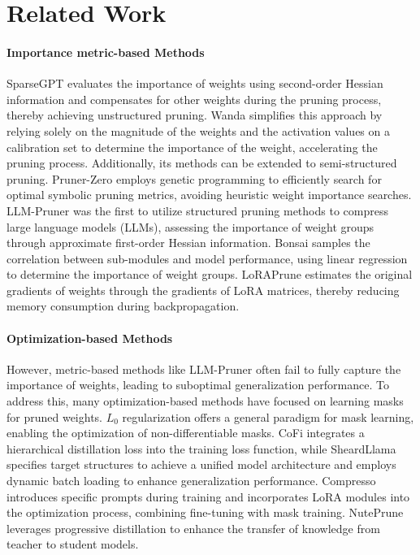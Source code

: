 \section{Related Work}

\paragraph{Importance metric-based Methods}SparseGPT \cite{frantar2023sparsegpt} evaluates the importance of weights using second-order Hessian information and compensates for other weights during the pruning process, thereby achieving unstructured pruning. Wanda \cite{sun2023wanda} simplifies this approach by relying solely on the magnitude of the weights and the activation values on a calibration set to determine the importance of the weight, accelerating the pruning process. Additionally, its methods can be extended to semi-structured pruning. Pruner-Zero \cite{dong2024pruner} employs genetic programming to efficiently search for optimal symbolic pruning metrics, avoiding heuristic weight importance searches. LLM-Pruner \cite{ma2023llm} was the first to utilize structured pruning methods to compress large language models (LLMs), assessing the importance of weight groups through approximate first-order Hessian information. Bonsai \cite{dery2024everybody} samples the correlation between sub-modules and model performance, using linear regression to determine the importance of weight groups. LoRAPrune \cite{zhang2023loraprune} estimates the original gradients of weights through the gradients of LoRA matrices, thereby reducing memory consumption during backpropagation.

\paragraph{Optimization-based Methods}However, metric-based methods like LLM-Pruner \cite{ma2023llm} often fail to fully capture the importance of weights, leading to suboptimal generalization performance. To address this, many optimization-based methods have focused on learning masks for pruned weights. $L_0$ regularization \cite{louizos2018learning} offers a general paradigm for mask learning, enabling the optimization of non-differentiable masks. CoFi \cite{xia2022structured} integrates a hierarchical distillation loss into the training loss function, while SheardLlama \cite{xia2023sheared} specifies target structures to achieve a unified model architecture and employs dynamic batch loading to enhance generalization performance. Compresso \cite{guo2023compresso} introduces specific prompts during training and incorporates LoRA modules into the optimization process, combining fine-tuning with mask training. NutePrune \cite{li2024nuteprune} leverages progressive distillation to enhance the transfer of knowledge from teacher to student models.